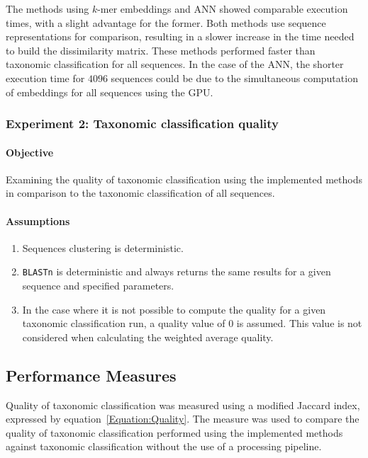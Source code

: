 \documentclass[pdflatex,sn-vancouver-num]{sn-jnl}%
\begin{document}
                The methods using $k$-mer embeddings and ANN showed comparable execution times, with a slight advantage for the former. Both methods use sequence representations for comparison, resulting in a slower increase in the time needed to build the dissimilarity matrix. These methods performed faster than taxonomic classification for all sequences. In the case of the ANN, the shorter execution time for $4096$ sequences could be due to the simultaneous computation of embeddings for all sequences using the GPU.

            \subsubsection{Experiment 2: Taxonomic classification quality}
                \paragraph{Objective}
                Examining the quality of taxonomic classification using the implemented methods in comparison to the taxonomic classification of all sequences.

                \paragraph{Assumptions}
                \begin{enumerate}
                    \item {
                        Sequences clustering is deterministic.
                    }
                    \item {
                        \texttt{BLASTn} is deterministic and always returns the same results for a given sequence and specified parameters.
                    }
                    \item {
                        In the case where it is not possible to compute the quality for a given taxonomic classification run, a quality value of $0$ is assumed. This value is not considered when calculating the weighted average quality.
                    }
                  \end{enumerate}


        \subsection{Performance Measures}
            Quality of taxonomic classification was measured using a modified Jaccard index, expressed by equation~\ref{Equation:Quality}. The measure was used to compare the quality of taxonomic classification performed using the implemented methods against taxonomic classification without the use of a processing pipeline.
\end{document}
